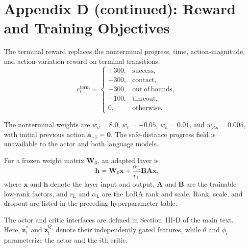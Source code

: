 \documentclass[11pt]{article}
\begin{document}
\clearpage
\section*{Appendix D (continued): Reward and Training Objectives}
\setcounter{equation}{0}
\renewcommand{\theequation}{D.\arabic{equation}}

The terminal reward replaces the nonterminal progress, time, action-magnitude, and action-variation reward on terminal transitions:
\begin{equation}
r_t^{\mathrm{term}}
=
\begin{cases}
+300, & \mathrm{success},\\
-300, & \mathrm{contact},\\
-300, & \mathrm{out\ of\ bounds},\\
-100, & \mathrm{timeout},\\
0, & \mathrm{otherwise}.
\end{cases}
\label{eq:terminal_reward}
\end{equation}

The nonterminal weights are $w_d=8.0$, $w_t=-0.05$, $w_a=0.01$, and $w_{\Delta a}=0.005$, with initial previous action $\mathbf a_{-1}=\mathbf0$. The safe-distance progress field is unavailable to the actor and both language models.

For a frozen weight matrix $\mathbf W_0$, an adapted layer is
\begin{equation}
\mathbf{h}
=
\mathbf{W}_0\mathbf{x}
+
\frac{\alpha_{\mathrm{L}}}{r_{\mathrm{L}}}
\mathbf{B}\mathbf{A}\mathbf{x},
\label{eq:lora}
\end{equation}
where $\mathbf{x}$ and $\mathbf{h}$ denote the layer input and output, $\mathbf{A}$ and $\mathbf{B}$ are the trainable low-rank factors, and $r_{\mathrm{L}}$ and $\alpha_{\mathrm{L}}$ are the LoRA rank and scale. Rank, scale, and dropout are listed in the preceding hyperparameter table.

The actor and critic interfaces are defined in Section~III-D of the main text. Here, $\widetilde{\mathbf z}_t^\pi$ and $\widetilde{\mathbf z}_t^{Q_i}$ denote their independently gated features, while $\theta$ and $\phi_i$ parameterize the actor and the $i$th critic.
\end{document}
